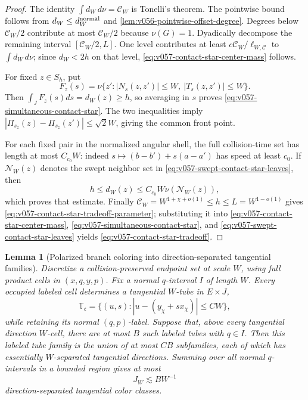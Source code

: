 \documentclass[10pt]{article}
\newtheorem{lemma}[theorem]{Lemma}
\begin{document}
\begin{proof}
The identity \(\int d_W\,d\nu=\mathcal C_W\) is Tonelli's theorem.  The pointwise bound follows
from \(d_W\le d_W^{\rm normal}\) and
\cref{lem:v056-pointwise-offset-degree}.  Degrees below \(\mathcal C_W/2\) contribute at most
\(\mathcal C_W/2\) because \(\nu(G)=1\).  Dyadically decompose the remaining interval
\([\mathcal C_W/2,L]\).  One level contributes at least
\(c\mathcal C_W/\ell_{W,\mathcal C}\) to \(\int d_W\,d\nu\); since \(d_W<2h\) on that level,
\eqref{eq:v057-contact-star-center-mass} follows.

For fixed \(z\in S_h\), put
\[
F_z(s)
=
\nu\{z':|N_s(z,z')|\le W,\ |T_s(z,z')|\le W\}.
\]
Then \(\int_JF_z(s)ds=d_W(z)\ge h\), so averaging in \(s\) proves
\eqref{eq:v057-simultaneous-contact-star}.  The two inequalities imply
\(|\Pi_{s_z}(z)-\Pi_{s_z}(z')|\le\sqrt2W\), giving the common front point.

For each fixed pair in the normalized angular shell, the full collision-time set has length at
most \(C_{c_0}W\): indeed
\(s\mapsto(b-b')+s(a-a')\) has speed at least \(c_0\).  If \(\mathcal N_W(z)\) denotes the swept
neighbor set in \eqref{eq:v057-swept-contact-star-leaves}, then
\[
h
\le
d_W(z)
\le
C_{c_0}W\nu(\mathcal N_W(z)),
\]
which proves that estimate.  Finally
\(\mathcal C_W=W^{1+\chi+o(1)}\le h\le L=W^{1-o(1)}\) gives
\eqref{eq:v057-contact-star-tradeoff-parameter}; substituting it into
\eqref{eq:v057-contact-star-center-mass},
\eqref{eq:v057-simultaneous-contact-star}, and
\eqref{eq:v057-swept-contact-star-leaves} yields
\eqref{eq:v057-contact-star-tradeoff}.
\end{proof}

\begin{lemma}[Polarized branch coloring into direction-separated tangential families]
\label{lem:v058-polarized-branch-coloring}
Discretize a collision-preserved endpoint set at scale \(W\), using full product cells in
\((x,q,y,p)\).  Fix a normal \(q\)-interval \(I\) of length \(W\).  Every occupied labeled cell
determines a tangential \(W\)-tube in \(E\times J\),
\[
\mathbb T_{\mathfrak c}
=
\{(u,s):|u-(y_\chi+s x_\chi)|\le C W\},
\]
while retaining its normal \((q,p)\)-label.  Suppose that, above every tangential direction
\(W\)-cell, there are at most \(B\) such labeled tubes with \(q\in I\).  Then this labeled tube
family is the union of at most \(C B\) subfamilies, each of which has essentially
\(W\)-separated tangential directions.  Summing over all normal \(q\)-intervals in a bounded
region gives at most
\begin{equation}
\label{eq:v058-global-tangential-color-count}
\boxed{J_W\lesssim B W^{-1}}
\end{equation}
direction-separated tangential color classes.
\end{lemma}
\end{document}
